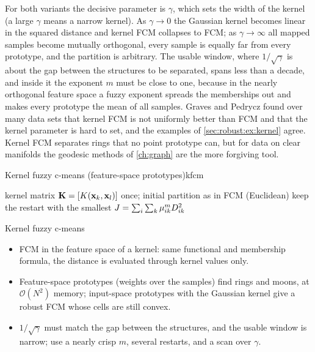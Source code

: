 For both variants the decisive parameter is $\gamma$, which sets the width of the kernel (a large $\gamma$ means a narrow kernel). As $\gamma\to0$ the Gaussian kernel becomes linear in the squared distance and kernel FCM collapses to FCM; as $\gamma\to\infty$ all mapped samples become mutually orthogonal, every sample is equally far from every prototype, and the partition is arbitrary. The usable window, where $1/\sqrt{\gamma}$ is about the gap between the structures to be separated, spans less than a decade, and inside it the exponent $m$ must be close to one, because in the nearly orthogonal feature space a fuzzy exponent spreads the memberships out and makes every prototype the mean of all samples. Graves and Pedrycz found over many data sets that kernel FCM is not uniformly better than FCM and that the kernel parameter is hard to set, and the examples of \cref{sec:robust:ex:kernel} agree. Kernel FCM separates rings that no point prototype can, but for data on clear manifolds the geodesic methods of \cref{ch:graph} are the more forgiving tool.

\begin{algobox}{Kernel fuzzy c-means (feature-space prototypes)}{kfcm}
\begin{algorithm}[H]
kernel matrix $\mathbf{K}=[K(\mathbf{x}_k,\mathbf{x}_l)]$ once; initial partition as in FCM (Euclidean)\;
keep the restart with the smallest $J=\sum_i\sum_k\mu_{ik}^mD^2_{ik}$\;
\end{algorithm}
\end{algobox}
\begin{summarybox}{Kernel fuzzy c-means}
\begin{itemize}
  \item FCM in the feature space of a kernel: same functional and membership formula, the distance is evaluated through kernel values only.
  \item Feature-space prototypes (weights over the samples) find rings and moons, at $\mathcal{O}(N^2)$ memory; input-space prototypes with the Gaussian kernel give a robust FCM whose cells are still convex.
  \item $1/\sqrt{\gamma}$ must match the gap between the structures, and the usable window is narrow; use a nearly crisp $m$, several restarts, and a scan over $\gamma$.
\end{itemize}
\end{summarybox}

